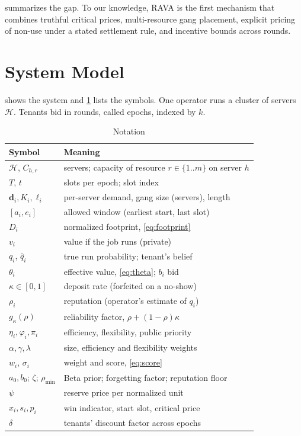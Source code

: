 \documentclass[journal]{IEEEtran}
\theoremstyle{remark}
\begin{document}
 summarizes the gap. To our knowledge, RAVA is the first mechanism that combines truthful critical prices, multi-resource gang placement, explicit pricing of non-use under a stated settlement rule, and incentive bounds across rounds.

\section{System Model}\label{sec:model}


 shows the system and \cref{tab:notation} lists the symbols. One operator runs a cluster of servers $\mathcal{H}$. Tenants bid in rounds, called epochs, indexed by $k$.

\begin{table}[!t]
\caption{Notation}\label{tab:notation}
\centering\footnotesize
\begin{tabular}{@{}ll@{}}
\toprule
Symbol & Meaning\\
\midrule
$\mathcal{H}$, $C_{h,r}$ & servers; capacity of resource $r\in\{1..m\}$ on server $h$\\
$T$, $t$ & slots per epoch; slot index\\
$\mathbf{d}_i, K_i, \ell_i$ & per-server demand, gang size (servers), length\\
$[a_i,e_i]$ & allowed window (earliest start, last slot)\\
$D_i$ & normalized footprint, \eqref{eq:footprint}\\
$v_i$ & value if the job runs (private)\\
$q_i$, $\hat q_i$ & true run probability; tenant's belief\\
$\theta_i$ & effective value, \eqref{eq:theta}; $b_i$ bid\\
$\kappa\in[0,1]$ & deposit rate (forfeited on a no-show)\\
$\rho_i$ & reputation (operator's estimate of $q_i$)\\
$g_\kappa(\rho)$ & reliability factor, $\rho+(1-\rho)\kappa$\\
$\eta_i,\varphi_i,\pi_i$ & efficiency, flexibility, public priority\\
$\alpha,\gamma,\lambda$ & size, efficiency and flexibility weights\\
$w_i$, $\sigma_i$ & weight and score, \eqref{eq:score}\\
$a_0,b_0$; $\zeta$; $\rho_{\min}$ & Beta prior; forgetting factor; reputation floor\\
$\psi$ & reserve price per normalized unit\\
$x_i, s_i, p_i$ & win indicator, start slot, critical price\\
$\delta$ & tenants' discount factor across epochs\\
\bottomrule
\end{tabular}
\end{table}
\end{document}
